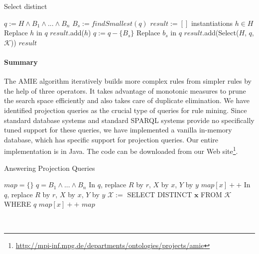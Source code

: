 \begin{algorithm}
\caption{Select distinct}
\label{select}
\begin{algorithmic}[1]
    \State $q := H \wedge B_1 \wedge ... \wedge B_n$
    \State $B_s := findSmallest(q)$
    \State $result := [ ]$
      \ForAll instantiations $h \in H$
	\State Replace $h$ in $q$
	  \State $result$.add($h$)
	\EndIf
      \EndFor
    \Else
      \State $q := q - \{ B_s\}$
      	\State Replace $b_s$ in $q$
      	\State $result$.add(Select($H$, $q$, $\mathcal{K}$))
      \EndFor
    \EndIf
    \State \Return $result$
\EndFunction
\end{algorithmic}
\end{algorithm}

\paragraph{Summary}
The AMIE algorithm iteratively builds more complex rules from simpler rules by the help of three operators.
It takes advantage of monotonic measures to prune the search space efficiently and also takes care of duplicate elimination.
We have identified projection queries as the crucial type of queries for rule mining.
Since standard database systems and standard SPARQL systems provide no specifically tuned support for these queries,
we have implemented a vanilla in-memory database, which has specific support for projection queries.
Our entire implementation is in Java. The code can be downloaded from our Web site\footnote{\url{http://mpi-inf.mpg.de/departments/ontologies/projects/amie}}.


\begin{algorithm}
\caption{Answering Projection Queries}
\label{algi}
\begin{algorithmic}[1]
    \State $map = \{\}$
    \State $q=B_1 \wedge ... \wedge B_n$
	    \State In $q$, replace $R$ by $r$, $X$ by $x$, $Y$ by $y$
		\State $map[x]++$
	    \EndIf
	  \EndFor
	\Else
	    \State In $q$, replace $R$ by $r$, $X$ by $x$, $Y$ by $y$
	    \State $\mathcal{X} :=$ SELECT DISTINCT $\bm{x}$ FROM $\mathcal{K}$ WHERE $q$
		  \State $map[x]++$
	    \EndFor
	  \EndFor
	\EndIf
	\State \Return $map$
\EndFunction
\end{algorithmic}
\end{algorithm}
\ \\[-1cm]
